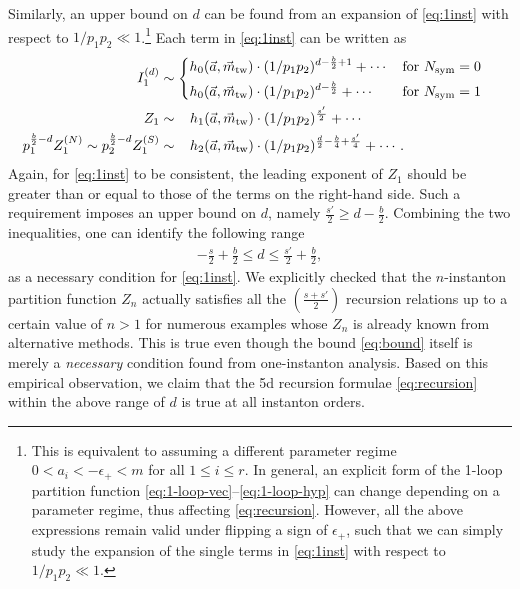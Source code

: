 \documentclass[letterpaper, 11pt]{article}
\def\e{\epsilon}
\begin{document}
{Similarly, an upper bound on $d$ can be found from an expansion of \eqref{eq:1inst} with respect to $ 1/p_1p_2 \ll 1$.\footnote{This is equivalent to assuming a different parameter regime $ 0 < a_i < -\e_+ < m$ for all $1\leq i \leq r$. In general, an explicit form of the 1-loop partition function \eqref{eq:1-loop-vec}--\eqref{eq:1-loop-hyp} can change depending on a parameter regime, thus affecting \eqref{eq:recursion}. However, all the above expressions remain valid under flipping a sign of $\epsilon_+$, such that we can simply study the expansion of the single terms in \eqref{eq:1inst} with respect to $ 1/p_1p_2 \ll 1$.} 
Each term in \eqref{eq:1inst} can be written as
\begin{align}
\begin{split}
  I_1^{(d)} &\sim \begin{dcases}
    h_0(\vec{a},  \vec{m}_{\text{tw}})\cdot  (1/p_1p_2)^{d-\frac{b}{2} + 1} + \cdots   &  \text{for }N_\text{sym} = 0\\
    h_0(\vec{a},  \vec{m}_{\text{tw}})\cdot (1/p_1p_2)^{d-\frac{b}{2} } + \cdots    &  \text{for }N_\text{sym} = 1
\end{dcases}
   \\
  Z_1 &\sim  \ \ \,  h_1(\vec{a},  \vec{m}_{\text{tw}})\cdot (1/p_1p_2)^{\frac{s'}{2}}  + \cdots   \\
  p_1^{\frac{b}{2}-d}Z_1^{(N)} \sim  p_2^{\frac{b}{2}-d}  Z^{(S)}_1&\sim \ \ \,  h_2(\vec{a},  \vec{m}_{\text{tw}})\cdot  (1/p_1p_2)^{\frac{d}{2}-\frac{b}{4}+\frac{s'}{4}}   + \cdots   .
\end{split}
\end{align}
Again, for \eqref{eq:1inst} to be consistent, the leading exponent of $Z_1$ should be greater than or equal to those of the terms on the right-hand side. Such a requirement imposes an upper bound on $d$, namely  $\frac{s'}{2} \geq  d - \frac{b}{2}$.
Combining the two inequalities, one can identify the following range
\begin{align}
  \label{eq:bound}
  -\frac{s}{2} + \frac{b}{2} \leq d \leq \frac{s'}{2} + \frac{b}{2},
\end{align}
as a necessary condition for \eqref{eq:1inst}. 
We explicitly checked that the $n$-instanton partition function $Z_n$ actually satisfies all the $(\frac{s+s'}{2})$ recursion relations up to a certain value of $n > 1$ for numerous examples whose $Z_n$ is already known from alternative methods. 
This is true even though the bound \eqref{eq:bound} itself is merely a \emph{necessary} condition found from one-instanton analysis. 
Based on this empirical observation, we claim that the 5d recursion formulae \eqref{eq:recursion} within the above range of $d$ is true at all instanton orders.


}
\end{document}
